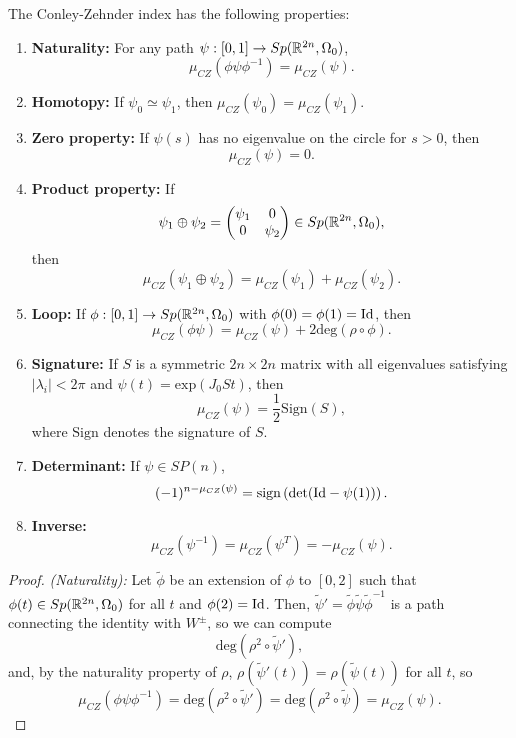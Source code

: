 \begin{prop} The Conley-Zehnder index has the following properties:
\begin{enumerate}
	\item {\bf Naturality:} For any path $\psi : [0,1] \rightarrow Sp(\mathbb{R}^{2n},\Omega_0)$,
	\[\mu_{CZ}(\phi \psi \phi^{-1}) = \mu_{CZ}(\psi) .\]
	\item {\bf Homotopy:} If $\psi_0 \simeq \psi_1$, then $\mu_{CZ}(\psi_0) = \mu_{CZ}(\psi_1)$.
	\item {\bf Zero property:} If $\psi(s)$ has no eigenvalue on the circle for $s > 0$, then
	\[\mu_{CZ}(\psi) = 0 .\]
	\item {\bf Product property:} If
	\[\psi_1 \oplus \psi_2 = \begin{pmatrix} \psi_1 & 0 \\ 0 & \psi_2 \end{pmatrix} \in Sp(\mathbb{R}^{2n},\Omega_0),\]
	then
	\[\mu_{CZ}(\psi_1 \oplus \psi_2) = \mu_{CZ}(\psi_1) + \mu_{CZ}(\psi_2) .\]
	\item {\bf Loop:} If $\phi : [0,1] \rightarrow Sp(\mathbb{R}^{2n},\Omega_0)$ with $\phi(0) = \phi(1) = \text{Id}$, then
	\[\mu_{CZ}(\phi \psi) = \mu_{CZ}(\psi) + 2 \text{deg}(\rho \circ \phi) .\]
	\item {\bf Signature:} If $S$ is a symmetric $2n \times 2n$ matrix with all eigenvalues satisfying $|\lambda_i| < 2\pi$ and $\psi(t) = \text{exp}(J_0St)$, then
	\[\mu_{CZ}(\psi) = \frac12 \text{Sign}(S),\]
	where $\text{Sign}$ denotes the signature of $S$.
	\item {\bf Determinant:} If $\psi \in SP(n)$,
	\[(-1)^{n-\mu_{CZ}(\psi)} = \text{sign} \left( \text{det}(\text{Id} - \psi(1)) \right) .\]
	\item {\bf Inverse:}
	\[\mu_{CZ}(\psi^{-1}) = \mu_{CZ}(\psi^T) = - \mu_{CZ}(\psi) .\]
\end{enumerate}
\end{prop}

\begin{proof} {\it (Naturality):} Let $\widetilde{\phi}$ be an extension of $\phi$ to $[0,2]$ such that $\phi(t) \in Sp(\mathbb{R}^{2n},\Omega_0)$ for all $t$ and $\phi(2) = \text{Id}$. Then, $\widetilde{\psi}' = \widetilde{\phi} \widetilde{\psi} \widetilde{\phi}^{-1}$ is a path connecting the identity with $W^{\pm}$, so we can compute
\[\text{deg}(\rho^2 \circ \widetilde{\psi}'),\]
and, by the naturality property of $\rho$, $\rho(\widetilde{\psi}'(t)) = \rho(\widetilde{\psi}(t))$ for all $t$, so
\[\mu_{CZ}(\phi\psi\phi^{-1}) = \text{deg}(\rho^2 \circ \widetilde{\psi}') = \text{deg}(\rho^2 \circ \widetilde{\psi}) = \mu_{CZ}(\psi) .\]
\end{proof}

